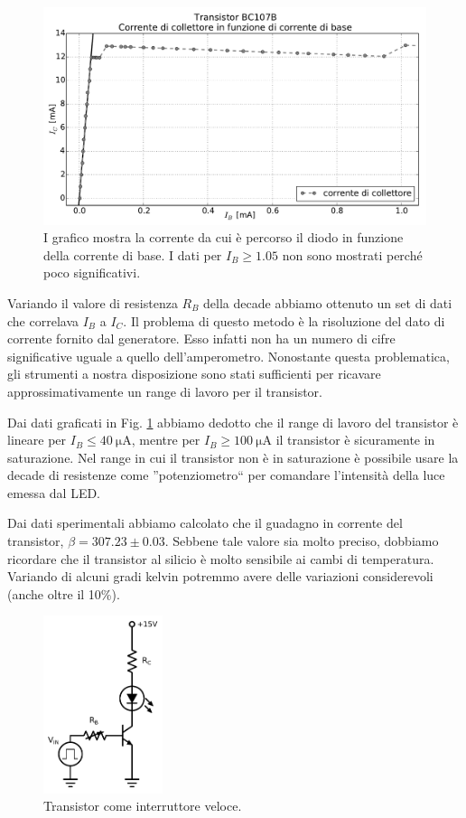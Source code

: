 \begin{figure}
	\includegraphics[width=119mm]{saturazione.pdf}
	\caption{I grafico mostra la corrente da cui è percorso il diodo in funzione della corrente di base. I dati per $I_B \geq 1.05$ non sono mostrati perché poco significativi.}
	\label{fig:saturazione}
\end{figure}

Variando il valore di resistenza $R_B$ della decade abbiamo ottenuto un set di dati che correlava $I_B$ a $I_C$.
Il problema di questo metodo è la risoluzione del dato di corrente fornito dal generatore.
Esso infatti non ha un numero di cifre significative uguale a quello dell'amperometro.
Nonostante questa problematica, gli strumenti a nostra disposizione sono stati sufficienti per ricavare approssimativamente un range di lavoro per il transistor.

Dai dati graficati in Fig. \ref{fig:saturazione} abbiamo dedotto che il range di lavoro del transistor è lineare per $I_B \leq \SI{40}{\micro\ampere}$, mentre per $I_B \geq \SI{100}{\micro\ampere}$ il transistor è sicuramente in saturazione. Nel range in cui il transistor non è in saturazione è possibile usare la decade di resistenze come ''potenziometro`` per comandare l'intensità della luce emessa dal LED.

Dai dati sperimentali abbiamo calcolato che il guadagno in corrente del transistor, $\beta=307.23 \pm 0.03$. Sebbene tale valore sia molto preciso, dobbiamo ricordare che il transistor al silicio è molto sensibile ai cambi di temperatura. Variando di alcuni gradi kelvin potremmo avere delle variazioni considerevoli (anche oltre il 10\%).  
\newpage
\begin{figure}
	\includegraphics[width=35mm]{cc2.pdf}
	\caption{Transistor come interruttore veloce.}
	\label{fig:cc2}
\end{figure}
